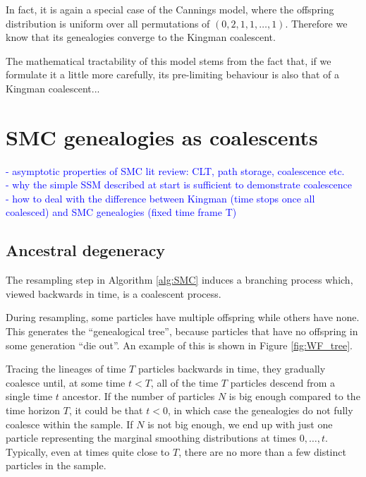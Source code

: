 \documentclass[fleqn]{article}
\theoremstyle{definition}
\begin{document}
In fact, it is again a special case of the Cannings model, where the offspring distribution is uniform over all permutations of $(0,2,1,1,\dots,1)$.
Therefore we know that its genealogies converge to the Kingman coalescent.

The mathematical tractability of this model stems from the fact that, if we formulate it a little more carefully, its pre-limiting behaviour is also that of a Kingman coalescent... 


\section{SMC genealogies as coalescents}
\textcolor{blue}{
- asymptotic properties of SMC lit review: CLT, path storage, coalescence etc.\\
- why the simple SSM described at start is sufficient to demonstrate coalescence\\
- how to deal with the difference between Kingman (time stops once all coalesced) and SMC genealogies (fixed time frame T)
}

\subsection{Ancestral degeneracy}
The resampling step in Algorithm \ref{alg:SMC} induces a branching process which, viewed backwards in time, is a coalescent process. 

During resampling, some particles have multiple offspring while others have none. This generates the ``genealogical tree'', because particles that have no offspring in some generation ``die out''.
An example of this is shown in Figure \ref{fig:WF_tree}.

Tracing the lineages of time $T$ particles backwards in time, they gradually coalesce until, at some time $t<T$, all of the time $T$ particles descend from a single time $t$ ancestor. 
If the number of particles $N$ is big enough compared to the time horizon $T$, it could be that $t<0$, in which case the genealogies do not fully coalesce within the sample. If $N$ is not big enough, we end up with just one particle representing the marginal smoothing distributions at times $0,\dots,t$.
Typically, even at times quite close to $T$, there are no more than a few distinct particles in the sample.
\end{document}
